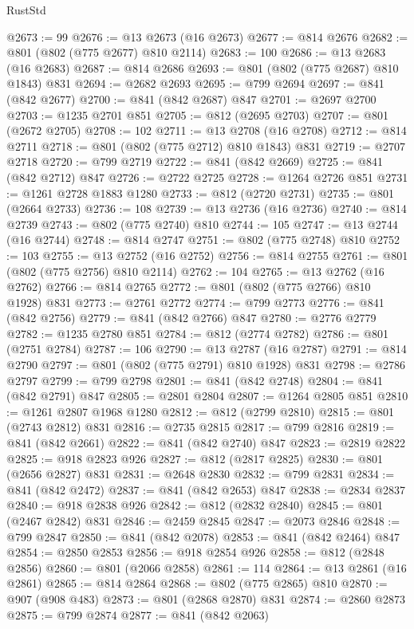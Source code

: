 \begin{lexlean}{RustStd}
\begin{coremodule}
{\begin{coremodule}
{{{{{@2673 := 99
@2676 := @13 @2673 (@16 @2673)
@2677 := @814 @2676
@2682 := @801 (@802 (@775 @2677) @810 @2114)
@2683 := 100
@2686 := @13 @2683 (@16 @2683)
@2687 := @814 @2686
@2693 := @801 (@802 (@775 @2687) @810 @1843) @831
@2694 := @2682 @2693
@2695 := @799 @2694
@2697 := @841 (@842 @2677)
@2700 := @841 (@842 @2687) @847
@2701 := @2697 @2700
@2703 := @1235 @2701 @851
@2705 := @812 (@2695 @2703)
@2707 := @801 (@2672 @2705)
@2708 := 102
@2711 := @13 @2708 (@16 @2708)
@2712 := @814 @2711
@2718 := @801 (@802 (@775 @2712) @810 @1843) @831
@2719 := @2707 @2718
@2720 := @799 @2719
@2722 := @841 (@842 @2669)
@2725 := @841 (@842 @2712) @847
@2726 := @2722 @2725
@2728 := @1264 @2726 @851
@2731 := @1261 @2728 @1883 @1280
@2733 := @812 (@2720 @2731)
@2735 := @801 (@2664 @2733)
@2736 := 108
@2739 := @13 @2736 (@16 @2736)
@2740 := @814 @2739
@2743 := @802 (@775 @2740) @810
@2744 := 105
@2747 := @13 @2744 (@16 @2744)
@2748 := @814 @2747
@2751 := @802 (@775 @2748) @810
@2752 := 103
@2755 := @13 @2752 (@16 @2752)
@2756 := @814 @2755
@2761 := @801 (@802 (@775 @2756) @810 @2114)
@2762 := 104
@2765 := @13 @2762 (@16 @2762)
@2766 := @814 @2765
@2772 := @801 (@802 (@775 @2766) @810 @1928) @831
@2773 := @2761 @2772
@2774 := @799 @2773
@2776 := @841 (@842 @2756)
@2779 := @841 (@842 @2766) @847
@2780 := @2776 @2779
@2782 := @1235 @2780 @851
@2784 := @812 (@2774 @2782)
@2786 := @801 (@2751 @2784)
@2787 := 106
@2790 := @13 @2787 (@16 @2787)
@2791 := @814 @2790
@2797 := @801 (@802 (@775 @2791) @810 @1928) @831
@2798 := @2786 @2797
@2799 := @799 @2798
@2801 := @841 (@842 @2748)
@2804 := @841 (@842 @2791) @847
@2805 := @2801 @2804
@2807 := @1264 @2805 @851
@2810 := @1261 @2807 @1968 @1280
@2812 := @812 (@2799 @2810)
@2815 := @801 (@2743 @2812) @831
@2816 := @2735 @2815
@2817 := @799 @2816
@2819 := @841 (@842 @2661)
@2822 := @841 (@842 @2740) @847
@2823 := @2819 @2822
@2825 := @918 @2823 @926
@2827 := @812 (@2817 @2825)
@2830 := @801 (@2656 @2827) @831
@2831 := @2648 @2830
@2832 := @799 @2831
@2834 := @841 (@842 @2472)
@2837 := @841 (@842 @2653) @847
@2838 := @2834 @2837
@2840 := @918 @2838 @926
@2842 := @812 (@2832 @2840)
@2845 := @801 (@2467 @2842) @831
@2846 := @2459 @2845
@2847 := @2073 @2846
@2848 := @799 @2847
@2850 := @841 (@842 @2078)
@2853 := @841 (@842 @2464) @847
@2854 := @2850 @2853
@2856 := @918 @2854 @926
@2858 := @812 (@2848 @2856)
@2860 := @801 (@2066 @2858)
@2861 := 114
@2864 := @13 @2861 (@16 @2861)
@2865 := @814 @2864
@2868 := @802 (@775 @2865) @810
@2870 := @907 (@908 @483)
@2873 := @801 (@2868 @2870) @831
@2874 := @2860 @2873
@2875 := @799 @2874
@2877 := @841 (@842 @2063)
}}}}}
\end{coremodule}}
\end{coremodule}
\end{lexlean}
